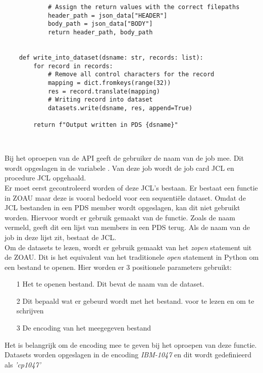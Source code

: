 \begin{lstlisting}
            # Assign the return values with the correct filepaths
            header_path = json_data["HEADER"]
            body_path = json_data["BODY"] 
            return header_path, body_path
    
    
    def write_into_dataset(dsname: str, records: list):
        for record in records:
            # Remove all control characters for the record
            mapping = dict.fromkeys(range(32))
            res = record.translate(mapping)
            # Writing record into dataset
            datasets.write(dsname, res, append=True)
            
        return f"Output written in PDS {dsname}"
    
    
\end{lstlisting}
\vspace{10 mm}
Bij het oproepen van de API geeft de gebruiker de naam van de job mee. Dit wordt opgeslagen in de variabele . Van deze job wordt de job card JCL en procedure JCL opgehaald.\\

Er moet eerst gecontroleerd worden of deze JCL's bestaan. Er bestaat een  functie in ZOAU maar deze is vooral bedoeld voor een sequentiële dataset. Omdat de JCL bestanden in een PDS member wordt opgeslagen, kan dit niet gebruikt worden. Hiervoor wordt er gebruik gemaakt van de  functie. Zoals de naam vermeld, geeft dit een lijst van members in een PDS terug. Als de naam van de job in deze lijst zit, bestaat de JCL. \\
 
Om de datasets te lezen, wordt er gebruik gemaakt van het \textit{zopen} statement uit de ZOAU. Dit is het equivalent van het traditionele \textit{open} statement in Python om een bestand te openen. Hier worden er 3 positionele parameters gebruikt: 
\begin{itemize}
    \item[1] Het te openen bestand. Dit bevat de naam van de dataset.
    \item[2] Dit bepaald wat er gebeurd wordt met het bestand. \textit{} voor te lezen en \textit{} om te schrijven
    \item[3] De encoding van het meegegeven bestand
\end{itemize} 
Het is belangrijk om de encoding mee te geven bij het oproepen van deze functie. Datasets worden opgeslagen in de encoding \textit{IBM-1047} en dit wordt gedefinieerd als \textit{'cp1047'}


